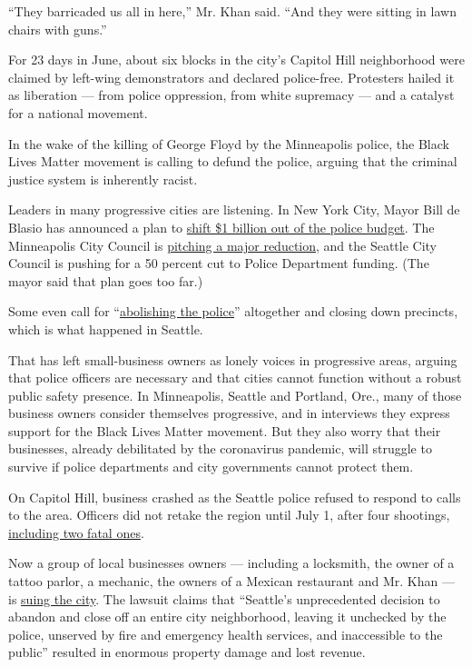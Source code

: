 ``They barricaded us all in here,'' Mr. Khan said. ``And they were
sitting in lawn chairs with guns.''

For 23 days in June, about six blocks in the city's Capitol Hill
neighborhood were claimed by left-wing demonstrators and declared
police-free. Protesters hailed it as liberation --- from police
oppression, from white supremacy --- and a catalyst for a national
movement.

In the wake of the killing of George Floyd by the Minneapolis police,
the Black Lives Matter movement is calling to defund the police, arguing
that the criminal justice system is inherently racist.

Leaders in many progressive cities are listening. In New York City,
Mayor Bill de Blasio has announced a plan to
\href{https://www.nytimes.com/2020/06/30/nyregion/nypd-budget.html}{shift
\$1 billion out of the police budget}. The Minneapolis City Council is
\href{https://www.nytimes.com/2020/06/07/us/minneapolis-police-abolish.html}{pitching
a major reduction}, and the Seattle City Council is pushing for a 50
percent cut to Police Department funding. (The mayor said that plan goes
too far.)

Some even call for
``\href{https://www.nytimes.com/2020/06/12/opinion/sunday/floyd-abolish-defund-police.html}{abolishing
the police}'' altogether and closing down precincts, which is what
happened in Seattle.

That has left small-business owners as lonely voices in progressive
areas, arguing that police officers are necessary and that cities cannot
function without a robust public safety presence. In Minneapolis,
Seattle and Portland, Ore., many of those business owners consider
themselves progressive, and in interviews they express support for the
Black Lives Matter movement. But they also worry that their businesses,
already debilitated by the coronavirus pandemic, will struggle to
survive if police departments and city governments cannot protect them.

On Capitol Hill, business crashed as the Seattle police refused to
respond to calls to the area. Officers did not retake the region until
July 1, after four shootings,
\href{https://www.nytimes.com/2020/06/22/us/seattle-autonomous-zone-chop-shootings.html}{including
two fatal ones}.

Now a group of local businesses owners --- including a locksmith, the
owner of a tattoo parlor, a mechanic, the owners of a Mexican restaurant
and Mr. Khan --- is
\href{https://www.seattletimes.com/seattle-news/capitol-hill-residents-and-businesses-sue-city-of-seattle-for-failing-to-disband-chop/}{suing
the city}. The lawsuit claims that ``Seattle's unprecedented decision to
abandon and close off an entire city neighborhood, leaving it unchecked
by the police, unserved by fire and emergency health services, and
inaccessible to the public'' resulted in enormous property damage and
lost revenue.


